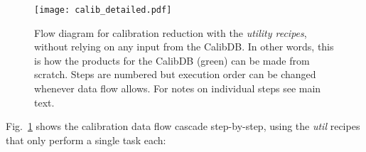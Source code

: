 \begin{figure}[!tb]
    \begin{center}
        \texttt{[image: calib\_detailed.pdf]}
    \end{center}
    \caption{
        \label{fig:calibflow_detailed}
        Flow diagram for calibration reduction with the \textit{utility
            recipes},
        without relying on any input from the CalibDB. In other words, this is
        how the products for the CalibDB (green) can be made from scratch.
        Steps
        are
        numbered but execution order can be changed whenever data flow allows.
        For
        notes on individual steps see main text.
    }
\end{figure}

Fig.~\ref{fig:calibflow_detailed} shows the calibration data flow cascade
step-by-step, using the \emph{util} recipes that only perform a single task
each:
